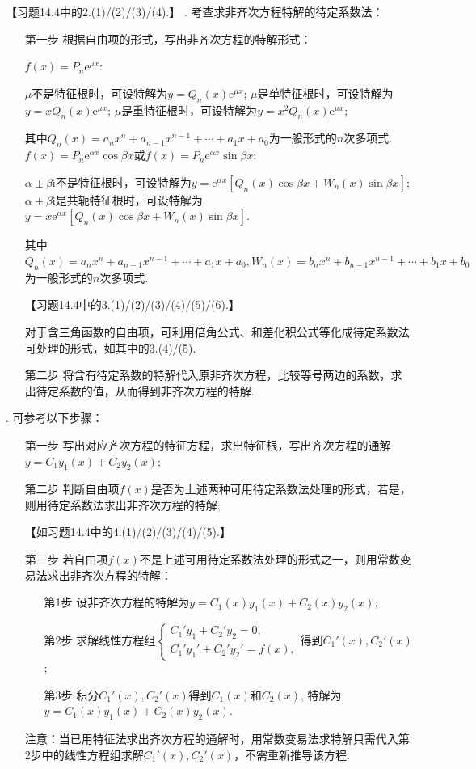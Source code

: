 \documentclass[12pt,UTF8,fleqn]{ctexart}
\newcommand{\me}[0]{\mathrm e}
\newcommand{\m}[0]{\mathrm }
\begin{document}
\begin{enumerate}
【习题14.4中的2.(1)/(2)/(3)/(4).】
. 考查求非齐次方程特解的待定系数法：
\begin{enumerate}
\item[第一步]根据自由项的形式，写出非齐次方程的特解形式：
\begin{enumerate}
$f(x)=P_n\me^{\mu x}$:
\begin{itemize}
$\mu$不是特征根时，可设特解为$y=Q_n(x)\me^{\mu x}$;
$\mu$是单特征根时，可设特解为$y=xQ_n(x)\me^{\mu x}$;
$\mu$是重特征根时，可设特解为$y=x^2Q_n(x)\me^{\mu x}$;
\end{itemize}
其中$Q_n(x)=a_nx^n+a_{n-1}x^{n-1}+\cdots+a_1x+a_0$为一般形式的$n$次多项式.
$f(x)=P_n\me^{\alpha x}\cos\beta x$或$f(x)=P_n\me^{\alpha x}\sin\beta x$:
\begin{itemize}
$\alpha\pm\beta\m i$不是特征根时，可设特解为$y=\me^{\alpha x}[Q_n(x)\cos\beta x+W_n(x)\sin\beta x]$;
$\alpha\pm\beta\m i$是共轭特征根时，可设特解为$y=x\me^{\alpha x}[Q_n(x)\cos\beta x+W_n(x)\sin\beta x]$.
\end{itemize}
其中$Q_n(x)=a_nx^n+a_{n-1}x^{n-1}+\cdots+a_1x+a_0, W_n(x)=b_nx^n+b_{n-1}x^{n-1}+\cdots+b_1x+b_0$为一般形式的$n$次多项式.
\end{enumerate}
【习题14.4中的3.(1)/(2)/(3)/(4)/(5)/(6).】

对于含三角函数的自由项，可利用倍角公式、和差化积公式等化成待定系数法可处理的形式，如其中的3.(4)/(5).
\item[第二步]将含有待定系数的特解代入原非齐次方程，比较等号两边的系数，求出待定系数的值，从而得到非齐次方程的特解.
\end{enumerate}
. 可参考以下步骤：
\begin{enumerate}
\item[第一步]写出对应齐次方程的特征方程，求出特征根，写出齐次方程的通解$y=C_1y_1(x)+C_2y_2(x)$;
\item[第二步]判断自由项$f(x)$是否为上述两种可用待定系数法处理的形式，若是，则用待定系数法求出非齐次方程的特解;

【如习题14.4中的4.(1)/(2)/(3)/(4)/(5).】
\item[第三步]若自由项$f(x)$不是上述可用待定系数法处理的形式之一，则用常数变易法求出非齐次方程的特解：
\begin{enumerate}
\item[第1步]设非齐次方程的特解为$y=C_1(x)y_1(x)+C_2(x)y_2(x)$;
\item[第2步]求解线性方程组$\begin{cases}C_1'y_1+C_2'y_2=0,\\C_1'y_1'+C_2'y_2'=f(x),\end{cases}$得到$C_1'(x),C_2'(x)$;
\item[第3步]积分$C_1'(x),C_2'(x)$得到$C_1(x)$和$C_2(x)$, 特解为$y=C_1(x)y_1(x)+C_2(x)y_2(x)$.
\end{enumerate}
注意：当已用特征法求出齐次方程的通解时，用常数变易法求特解只需代入第2步中的线性方程组求解$C_1'(x),C_2'(x)$，不需重新推导该方程.


\end{enumerate}
\end{enumerate}
\end{document}
